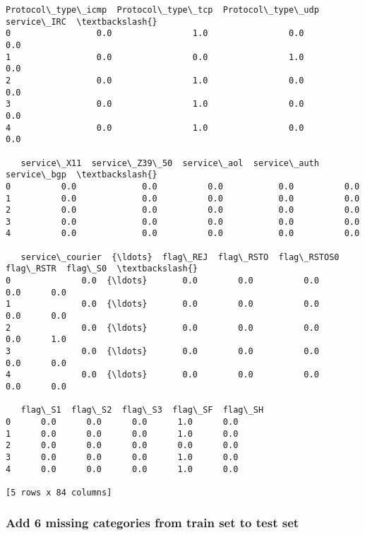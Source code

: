 \documentclass[11pt]{article}
\makeatletter
\newcommand{\boxspacing}{\kern\kvtcb@left@rule\kern\kvtcb@boxsep}
\newcommand{\prompt}[4]{
        {\ttfamily\llap{{\color{#2}[#3]:\hspace{3pt}#4}}\vspace{-\baselineskip}}
    }
\makeatother
\begin{document}
            \begin{tcolorbox}[breakable, size=fbox, boxrule=.5pt, pad at break*=1mm, opacityfill=0]
\prompt{Out}{outcolor}{11}{\boxspacing}
\begin{Verbatim}[commandchars=\\\{\}]
   Protocol\_type\_icmp  Protocol\_type\_tcp  Protocol\_type\_udp  service\_IRC  \textbackslash{}
0                 0.0                1.0                0.0          0.0
1                 0.0                0.0                1.0          0.0
2                 0.0                1.0                0.0          0.0
3                 0.0                1.0                0.0          0.0
4                 0.0                1.0                0.0          0.0

   service\_X11  service\_Z39\_50  service\_aol  service\_auth  service\_bgp  \textbackslash{}
0          0.0             0.0          0.0           0.0          0.0
1          0.0             0.0          0.0           0.0          0.0
2          0.0             0.0          0.0           0.0          0.0
3          0.0             0.0          0.0           0.0          0.0
4          0.0             0.0          0.0           0.0          0.0

   service\_courier  {\ldots}  flag\_REJ  flag\_RSTO  flag\_RSTOS0  flag\_RSTR  flag\_S0  \textbackslash{}
0              0.0  {\ldots}       0.0        0.0          0.0        0.0      0.0
1              0.0  {\ldots}       0.0        0.0          0.0        0.0      0.0
2              0.0  {\ldots}       0.0        0.0          0.0        0.0      1.0
3              0.0  {\ldots}       0.0        0.0          0.0        0.0      0.0
4              0.0  {\ldots}       0.0        0.0          0.0        0.0      0.0

   flag\_S1  flag\_S2  flag\_S3  flag\_SF  flag\_SH
0      0.0      0.0      0.0      1.0      0.0
1      0.0      0.0      0.0      1.0      0.0
2      0.0      0.0      0.0      0.0      0.0
3      0.0      0.0      0.0      1.0      0.0
4      0.0      0.0      0.0      1.0      0.0

[5 rows x 84 columns]
\end{Verbatim}
\end{tcolorbox}
        
    \hypertarget{add-6-missing-categories-from-train-set-to-test-set}{%
\subsubsection{Add 6 missing categories from train set to test
set}\label{add-6-missing-categories-from-train-set-to-test-set}}
\end{document}
